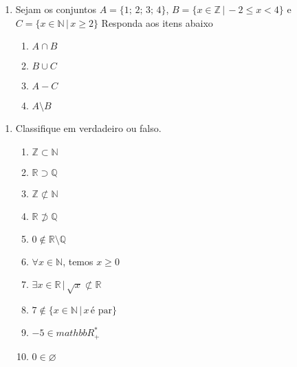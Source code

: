 \documentclass[a4paper, 12pt]{article}
\begin{document}
\begin{enumerate}
\item Sejam os conjuntos $A = \{1; \, 2; \, 3; \, 4 \}$,
$B = \{ x \in \mathbb{Z} \,|\, -2 \leq x <  4 \}$ e
$C = \{ x \in \mathbb{N} \,|\, x \geq 2 \}$ Responda aos itens abaixo
	\begin{enumerate}
		\item $A \cap B$
		\item $B \cup C$
		\item $A - C$
		\item $A\setminus B$
	\end{enumerate}
\end{enumerate}

\begin{enumerate}
\item Classifique em verdadeiro ou falso.

	\begin{enumerate}
		\item $\mathbb{Z} \subset \mathbb{N}$
		\item $\mathbb{R} \supset \mathbb{Q}$
		\item $\mathbb{Z} \not\subset \mathbb{N}$
		\item $\mathbb{R} \not\supset \mathbb{Q}$
		\item $0 \not\in \mathbb{R}\setminus\mathbb{Q}$
		\item $\forall x \in \mathbb{N}$, temos $x \geq 0$
		\item $\exists x \in \mathbb{R} \,|\, \sqrt{x} \not\subset \mathbb{R}$
		\item $7 \not\in \{ x\in \mathbb{N} \,|\, x \, \textrm{é par} \}$
		\item $-5 \in mathbb{R}^*_+$
		\item $0 \in \varnothing$
	\end{enumerate}
	
\end{enumerate}
\end{document}
